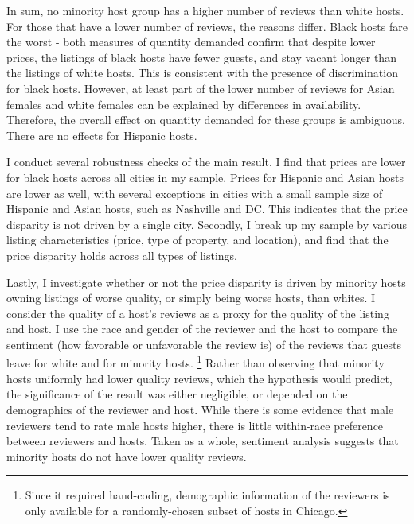In sum, no minority host group has a higher number of reviews than white hosts. For those that have a lower number of reviews, the reasons differ. Black hosts fare the worst - both measures of quantity demanded confirm that despite lower prices, the listings of black hosts have fewer guests, and stay vacant longer than the listings of white hosts. This is consistent with the presence of discrimination for black hosts. However, at least part of the lower number of reviews for Asian females and white females can be explained by differences in availability. Therefore, the overall effect on quantity demanded for these groups is ambiguous. There are no effects for Hispanic hosts. 

I conduct several robustness checks of the main result. I find that prices are lower for black hosts across all cities in my sample. Prices for Hispanic and Asian hosts are lower as well, with several exceptions in cities with a small sample size of Hispanic and Asian hosts, such as Nashville and DC. This indicates that the price disparity is not driven by a single city. Secondly, I break up my sample by various listing characteristics (price, type of property, and location), and find that the price disparity holds across all types of listings. 

Lastly, I investigate whether or not the price disparity is driven by minority hosts owning listings of worse quality, or simply being worse hosts, than whites. I consider the quality of a host's reviews as a proxy for the quality of the listing and host. I use the race and gender of the reviewer and the host to compare the sentiment (how favorable or unfavorable the review is) of the reviews that guests leave for white and for minority hosts.%
	\footnote{Since it required hand-coding, demographic information of the reviewers is only available for a randomly-chosen subset of hosts in Chicago.} 
Rather than observing that minority hosts uniformly had lower quality reviews, which the hypothesis would predict, the significance of the result was either negligible, or depended on the demographics of the reviewer and host. While there is some evidence that male reviewers tend to rate male hosts higher, there is little within-race preference between reviewers and hosts. Taken as a whole, sentiment analysis suggests that minority hosts do not have lower quality reviews. 

